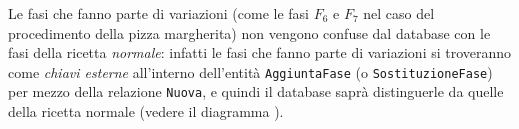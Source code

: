 Le fasi che fanno parte di variazioni (come le fasi $F_{6}$ e $F_{7}$ nel caso del procedimento
della pizza margherita) non vengono confuse dal database con le fasi della ricetta {\it normale}:
infatti le fasi che fanno parte di variazioni si troveranno come {\it chiavi esterne}
all'interno dell'entità {\tt AggiuntaFase} (o {\tt SostituzioneFase}) per mezzo della relazione
{\tt Nuova}, e quindi il database saprà distinguerle da quelle della ricetta normale
(vedere il diagramma ).
